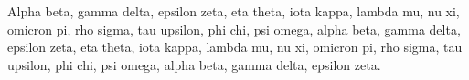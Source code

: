 \documentclass[a4paper,10pt]{article}
\begin{document}
Alpha beta, gamma delta, epsilon zeta, eta theta, iota kappa, lambda mu, nu xi, omicron pi, rho sigma, tau upsilon, phi chi, psi omega, alpha beta, gamma delta, epsilon zeta, eta theta, iota kappa, lambda mu, nu xi, omicron pi, rho sigma, tau upsilon, phi chi, psi omega, alpha beta, gamma delta, epsilon zeta.
\end{document}

